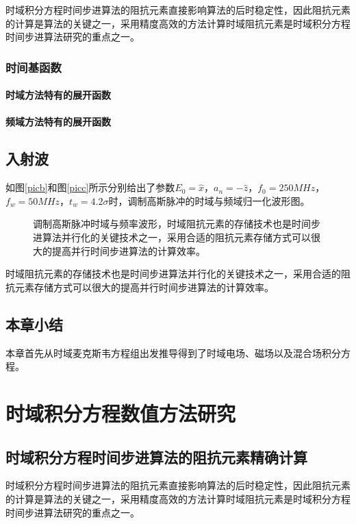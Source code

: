 \documentclass[bachelor]{thesis-uestc}
\begin{document}
时域积分方程时间步进算法的阻抗元素直接影响算法的后时稳定性，因此阻抗元素的计算是算法的关键之一，采用精度高效的方法计算时域阻抗元素是时域积分方程时间步进算法研究的重点之一。


\subsection{时间基函数}

\subsubsection{时域方法特有的展开函数}

\subsubsection{频域方法特有的展开函数}

\section{入射波}

如图\ref{picb}和图\ref{picc}所示分别给出了参数$E_0=\hat{x}$，$a_n=-\hat{z}$，$f_0=250MHz$，$f_w=50MHz$，$t_w=4.2\sigma$时，调制高斯脉冲的时域与频域归一化波形图。

\begin{figure}[h]
\caption{调制高斯脉冲时域与频率波形，时域阻抗元素的存储技术也是时间步进算法并行化的关键技术之一，采用合适的阻抗元素存储方式可以很大的提高并行时间步进算法的计算效率。}
\label{fig1}
\end{figure}
时域阻抗元素的存储技术也是时间步进算法并行化的关键技术之一，采用合适的阻抗元素存储方式可以很大的提高并行时间步进算法的计算效率。

\section{本章小结}
本章首先从时域麦克斯韦方程组出发推导得到了时域电场、磁场以及混合场积分方程。

\chapter{时域积分方程数值方法研究}
\section{时域积分方程时间步进算法的阻抗元素精确计算}
时域积分方程时间步进算法的阻抗元素直接影响算法的后时稳定性，因此阻抗元素的计算是算法的关键之一，采用精度高效的方法计算时域阻抗元素是时域积分方程时间步进算法研究的重点之一。
\end{document}
